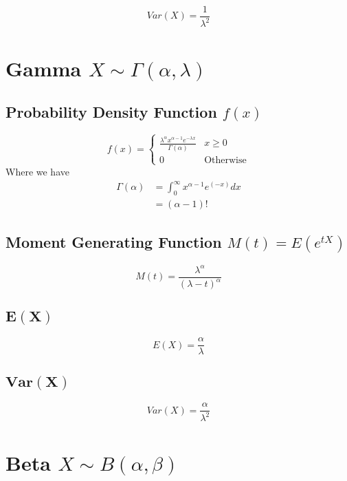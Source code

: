 \documentclass[12pt]{article}
\begin{document}
\begin{equation*}
  Var(X)= \frac{1}{\lambda^{2}}
\end{equation*}

\newpage
\section{Gamma $X \sim \Gamma(\alpha,\lambda)$}
\subsection{Probability Density Function $f(x)$}

\begin{equation*}
  f(x) =
  \begin{cases}
     \frac{\lambda^{\alpha} x^{\alpha -1} e^{-\lambda x}}{\Gamma(\alpha)} & x \geq 0 \\
     0 & \text{Otherwise}
  \end{cases}
\end{equation*}
Where we have
\begin{align*}
  \Gamma(\alpha) &= \int_{0}^{\infty}x^{\alpha -1}e^(-x) dx \\
                 &= (\alpha -1)!
\end{align*}
\subsection{Moment Generating Function $M(t)=E(e^{tX})$}

\begin{equation*}
    M(t)=\frac{\lambda^{\alpha}}{(\lambda -t)^{\alpha}}
\end{equation*}

\subsection{$\bm{E(X)}$}

\begin{equation*}
  E(X) = \frac{\alpha}{\lambda}
\end{equation*}

\subsection{$\bm{Var(X)}$}

\begin{equation*}
  Var(X)= \frac{\alpha}{\lambda^{2}}
\end{equation*}
\newpage
\section{Beta $X \sim B(\alpha,\beta)$}
\end{document}

